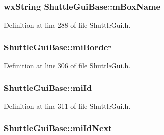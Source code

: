 \subsubsection[{\texorpdfstring{m\+Box\+Name}{mBoxName}}]{\setlength{\rightskip}{0pt plus 5cm}wx\+String Shuttle\+Gui\+Base\+::m\+Box\+Name\hspace{0.3cm}{\ttfamily [protected]}}\hypertarget{class_shuttle_gui_base_a7499eefd5965e635f08ea05d0ced0b70}{}\label{class_shuttle_gui_base_a7499eefd5965e635f08ea05d0ced0b70}


Definition at line 288 of file Shuttle\+Gui.\+h.

\subsubsection[{\texorpdfstring{mi\+Border}{miBorder}}]{ Shuttle\+Gui\+Base\+::mi\+Border\hspace{0.3cm}{\ttfamily [protected]}}\hypertarget{class_shuttle_gui_base_a1994985a93b3050f293e258697a624d7}{}\label{class_shuttle_gui_base_a1994985a93b3050f293e258697a624d7}


Definition at line 306 of file Shuttle\+Gui.\+h.

\subsubsection[{\texorpdfstring{mi\+Id}{miId}}]{ Shuttle\+Gui\+Base\+::mi\+Id\hspace{0.3cm}{\ttfamily [protected]}}\hypertarget{class_shuttle_gui_base_a482d02d1267275e724e07a3a4afbb3a0}{}\label{class_shuttle_gui_base_a482d02d1267275e724e07a3a4afbb3a0}


Definition at line 311 of file Shuttle\+Gui.\+h.

\subsubsection[{\texorpdfstring{mi\+Id\+Next}{miIdNext}}]{ Shuttle\+Gui\+Base\+::mi\+Id\+Next\hspace{0.3cm}{\ttfamily [protected]}}\hypertarget{class_shuttle_gui_base_aae93c57a77ece4fb763126f275a7da76}{}\label{class_shuttle_gui_base_aae93c57a77ece4fb763126f275a7da76}


